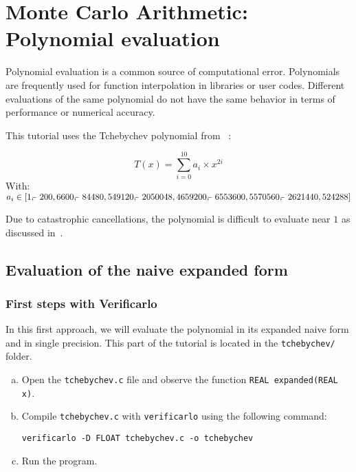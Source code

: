 \section{Monte Carlo Arithmetic: Polynomial evaluation}

Polynomial evaluation is a common source of computational error. Polynomials are
frequently used for function interpolation in libraries or user codes.
Different evaluations of the same polynomial do not have the same
behavior in terms of performance or numerical accuracy.

This tutorial uses the Tchebychev polynomial from ~\cite[pp.52-54]{parker1997monte}:

$$T(x)=\sum_{i=0}^{10}{a_i \times x^{2i}}$$
With:
$a_i \in [
    1,
    \matminus 200,
    6600,
    \matminus 84480,
    549120,
    \matminus 2050048,
    4659200,
    \matminus 6553600,
    5570560,
    \matminus 2621440,
    524288
  ]$

Due to catastrophic cancellations, the polynomial is difficult to evaluate near
$1$ as discussed in~\cite[pp.52-54]{parker1997monte}.

\subsection{Evaluation of the naive expanded form}

\subsubsection{First steps with Verificarlo}

In this first approach, we will evaluate the polynomial in its expanded naive
form and in single precision. This part of the tutorial is located in the
\texttt{tchebychev/} folder.

\begin{question}
  \begin{enumerate}[(a)]
    \item Open the {\tt tchebychev.c} file and observe the function {\tt REAL expanded(REAL x)}.

    \item Compile {\tt tchebychev.c} with {\tt verificarlo} using the following command:
          \begin{verbatim}
verificarlo -D FLOAT tchebychev.c -o tchebychev
\end{verbatim}
    \item Run the program.
  \end{enumerate}
\end{question}

